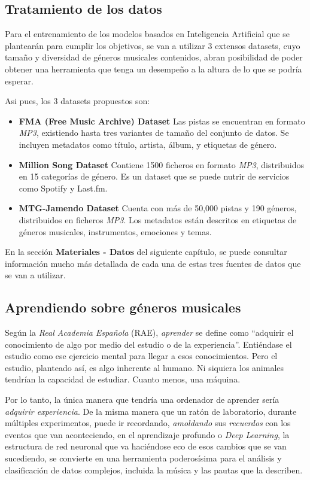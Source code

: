 \subsection{Tratamiento de los datos}
\label{tratamiento-datos}

Para el entrenamiento de los modelos basados en Inteligencia Artificial que se plantearán para cumplir los objetivos, se van a utilizar 3 extensos datasets, cuyo tamaño y diversidad de géneros musicales contenidos, abran posibilidad de poder obtener una herramienta que tenga un desempeño a la altura de lo que se podría esperar.

Asi pues, los 3 datasets propuestos son:

\begin{itemize}
    \item \textbf{FMA (Free Music Archive) Dataset}
        Las pistas se encuentran en formato \emph{MP3}, existiendo hasta tres variantes de tamaño del conjunto de datos.
        Se incluyen metadatos como título, artista, álbum, y etiquetas de género.
    \item \textbf{Million Song Dataset}
        Contiene 1500 ficheros en formato \emph{MP3}, distribuidos en 15 categorías de género. Es un dataset que se puede nutrir de servicios como Spotify y Last.fm.
    \item \textbf{MTG-Jamendo Dataset}
       Cuenta con más de 50,000 pistas y 190 géneros, distribuidos en ficheros \emph{MP3}. Los metadatos están descritos en etiquetas de géneros musicales, instrumentos, emociones y temas.
\end{itemize}
En la sección \textbf{Materiales - Datos} del siguiente capítulo, se puede consultar información mucho más detallada de cada una de estas tres fuentes de datos que se van a utilizar.

\subsection{Aprendiendo sobre géneros musicales}

Según la \emph{Real Academia Española} (RAE), \emph{aprender} se define como ``adquirir el conocimiento de algo por medio del estudio o de la experiencia''\citep{rae_aprender}. Entiéndase el estudio como ese ejercicio mental para llegar a esos conocimientos. Pero el estudio, planteado así, es algo inherente al humano. Ni siquiera los animales tendrían la capacidad de estudiar. Cuanto menos, una máquina.

Por lo tanto, la única manera que tendría una ordenador de aprender sería \emph{adquirir experiencia}. De la misma manera que un ratón de laboratorio, durante múltiples experimentos, puede ir recordando, \emph{amoldando} sus \emph{recuerdos} con los eventos que van aconteciendo, en el aprendizaje profundo o \emph{Deep Learning}, la estructura de red neuronal que va haciéndose eco de esos cambios que se van sucediendo, se convierte en una herramienta poderosísima para el análisis y clasificación de datos complejos, incluida la música y las pautas que la describen. 

